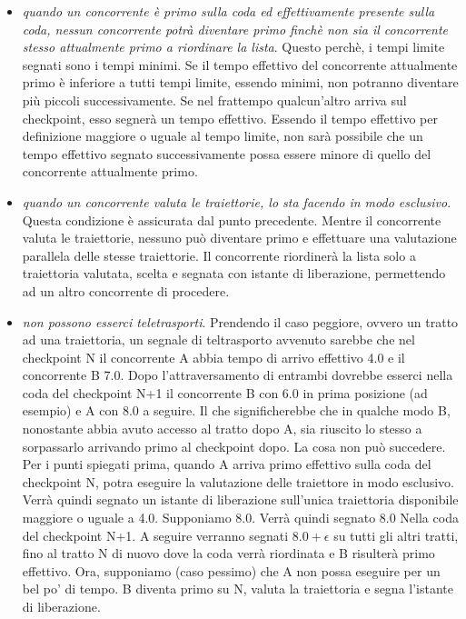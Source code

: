 \begin{itemize}
\item \emph{quando un concorrente \`{e} primo sulla coda ed effettivamente presente sulla coda, nessun concorrente potr\`{a} diventare primo finch\`{e} non sia il concorrente
stesso attualmente primo a riordinare la lista}. Questo perch\`{e}, i tempi limite segnati sono i tempi minimi. Se il tempo effettivo del concorrente attualmente
primo \`{e} inferiore a tutti tempi limite, essendo minimi, non potranno diventare pi\`{u} piccoli successivamente. Se nel frattempo qualcun'altro arriva sul 
checkpoint, esso segner\`{a} un tempo effettivo. Essendo il tempo effettivo per definizione maggiore o uguale al tempo limite, non sar\`{a} possibile che un tempo
effettivo segnato successivamente possa essere minore di quello del concorrente attualmente primo.
\item \emph{quando un concorrente valuta le traiettorie, lo sta facendo in modo esclusivo}. Questa condizione \`{e} assicurata dal punto precedente. Mentre il 
concorrente valuta le traiettorie, nessuno pu\`{o} diventare primo e effettuare una valutazione parallela delle stesse traiettorie. Il concorrente riordiner\`{a}
la lista solo a traiettoria valutata, scelta e segnata con istante di liberazione, permettendo ad un altro concorrente di procedere.
\item \emph{non possono esserci teletrasporti}. Prendendo il caso peggiore, ovvero un tratto ad una traiettoria, un segnale di teltrasporto avvenuto sarebbe
che nel checkpoint N il concorrente A abbia tempo di arrivo effettivo 4.0 e il concorrente B 7.0. Dopo l'attraversamento di entrambi dovrebbe esserci nella 
coda del checkpoint N+1 il concorrente B con 6.0 in prima posizione (ad esempio) e A con 8.0 a seguire. Il che significherebbe che in qualche modo B, nonostante
abbia avuto accesso al tratto dopo A, sia riuscito lo stesso a sorpassarlo arrivando primo al checkpoint dopo. La cosa non pu\`{o} succedere. Per i punti spiegati
prima, quando A arriva primo effettivo sulla coda del checkpoint N, potra eseguire la valutazione delle traiettore in modo esclusivo. Verr\`{a} quindi segnato
un istante di liberazione sull'unica traiettoria disponibile maggiore o uguale a 4.0. Supponiamo 8.0. Verr\`{a} quindi segnato 8.0 Nella coda del checkpoint N+1. A
seguire verranno segnati $8.0+\epsilon$ su tutti gli altri tratti, fino al tratto N di nuovo dove la coda verr\`{a} riordinata e B risulter\`{a} primo effettivo.
Ora, supponiamo (caso pessimo) che A non possa eseguire per un bel po' di tempo. B diventa primo su N, valuta la traiettoria e segna l'istante di liberazione.

\end{itemize}
